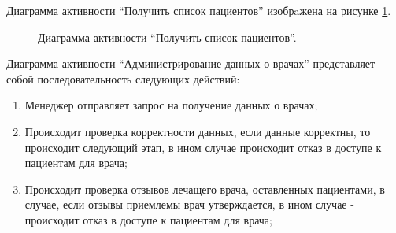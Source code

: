         Диаграмма активности  “Получить список пациентов” изобрaжена на рисунке \ref{diagram-patient-list}.

        \begin{figure}[H]%
            \centering
            \caption{Диаграмма активности  “Получить список пациентов”.} \label{diagram-patient-list}
        \end{figure} 

        Диаграмма активности “Администрирование данных о врачах” %
        представляет собой последовательность следующих действий:
        \begin{enumerate}
            \item Менеджер отправляет запрос на получение данных о врачах;
            \item Происходит проверка корректности данных, если данные %
            корректны, то происходит следующий этап, в ином случае происходит %
            отказ в доступе к пациентам для врача;
            \item Происходит проверка отзывов лечащего врача, %
            оставленных пациентами, в случае, если отзывы приемлемы врач %
            утверждается, в ином случае - происходит отказ в доступе к пациентам %
            для врача;
        \end{enumerate}
        
